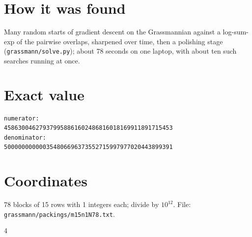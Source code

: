 \documentclass[11pt,a4paper]{article}
\begin{document}
\section{How it was found}
Many random starts of gradient descent on the Grassmannian against a log-sum-exp of the pairwise overlaps, sharpened over time, then a polishing stage (\texttt{grassmann/solve.py}); about 78 seconds on one laptop, with about ten such searches running at once.


\appendix
\section{Exact value}
{\small
\begin{verbatim}
numerator:
458630046279379958861602486816018169911891715453
denominator:
500000000000354806696373552715997977020443899391
\end{verbatim}}

\section{Coordinates}
78 blocks of 15 rows with 1 integers each; divide by $10^{12}$. File: \texttt{grassmann/packings/m15n1N78.txt}.
{\tiny
\begin{multicols}{4}
\end{multicols}}
\end{document}
